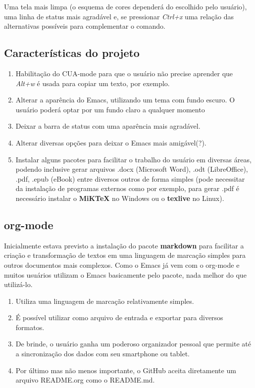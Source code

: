 \documentclass[]{article}
\providecommand{\tightlist}{%
  \setlength{\itemsep}{0pt}\setlength{\parskip}{0pt}}
\begin{document}
Uma tela mais limpa (o esquema de cores dependerá do escolhido pelo
usuário), uma linha de status mais agradável e, se pressionar
\emph{Ctrl+x} uma relação das alternativas possíveis para complementar o
comando.

\subsection{Características do
projeto}\label{caracteruxedsticas-do-projeto}

\begin{enumerate}
\tightlist
\item
  Habilitação do CUA-mode para que o usuário não precise aprender que
  \emph{Alt+w} é usada para copiar um texto, por exemplo.
\item
  Alterar a aparência do Emacs, utilizando um tema com fundo escuro. O
  usuário poderá optar por um fundo claro a qualquer momento
\item
  Deixar a barra de status com uma aparência mais agradável.
\item
  Alterar diversas opções para deixar o Emacs mais amigável(?).
\item
  Instalar alguns pacotes para facilitar o trabalho do usuário em
  diversas áreas, podendo inclusive gerar arquivos .docx (Microsoft
  Word), .odt (LibreOffice), .pdf, .epub (eBook) entre diversos outros
  de forma simples (pode necessitar da instalação de programas externos
  como por exemplo, para gerar .pdf é necessário instalar o
  \textbf{MiKTeX} no Windows ou o \textbf{texlive} no Linux).
\end{enumerate}

\subsection{org-mode}\label{org-mode}

Inicialmente estava previsto a instalação do pacote \textbf{markdown}
para facilitar a criação e transformação de textos em uma linguagem de
marcação simples para outros documentos mais complexos. Como o Emacs já
vem com o org-mode e muitos usuários utilizam o Emacs basicamente pelo
pacote, nada melhor do que utilizá-lo.

\begin{enumerate}
\tightlist
\item
  Utiliza uma linguagem de marcação relativamente simples.
\item
  É possível utilizar como arquivo de entrada e exportar para diversos
  formatos.
\item
  De brinde, o usuário ganha um poderoso organizador pessoal que permite
  até a sincronização dos dados com seu smartphone ou tablet.
\item
  Por último mas não menos importante, o GitHub aceita diretamente um
  arquivo README.org como o README.md.
\end{enumerate}
\end{document}

